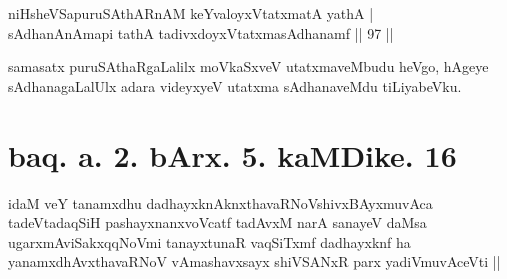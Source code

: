 \begin{shl}
niHsheVSapuruSAthARnAM keYvaloyxVtatxmatA yathA |\\
sAdhanAnAmapi tathA tadivxdoyxVtatxmasAdhanamf \hfill || 97 ||
\end{shl}

\begin{artha}
samasatx puruSAthaRgaLalilx moVkaSxveV utatxmaveMbudu heVgo, hAgeye sAdhanagaLalUlx adara videyxyeV utatxma sAdhanaveMdu tiLiyabeVku.
\end{artha}

\section*{baq. a. 2. bArx. 5. kaMDike. 16}

\begin{shl}
idaM veY tanamxdhu dadhayxknAknxthavaRNoV\s shivxBAyxmuvAca tadeVtadaqSiH pashayxnanxvoVcatf tadAvxM narA sanayeV daMsa ugarxmAviSakxqqNoVmi tanayxtunaR vaqSiTxmf dadhayxknf ha yanamxdhAvxthavaRNoV vAmashavxsayx shiVSANxR parx yadiVmuvAceVti ||
\end{shl}

